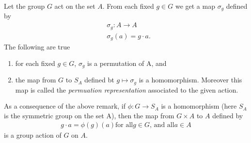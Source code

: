 \documentclass[../main]{subfiles}
\begin{document}
 
 \begin{rmk}
  Let the group $G$ act on the set $A$. From each fixed $g\in G$ we get a map $\sigma_g$ defined by 
  \begin{align*}
   &\sigma_g \colon A \to A \\
   &\sigma_g(a)=g\cdot a.
  \end{align*}
  The following are true
  \begin{enumerate}
   \item for each fixed $g\in G$, $\sigma_g$ is a permutation of A, and 
   \item the map from $G$ to $S_A$ defined bt $g\mapsto \sigma_g$ is a homomorphism. Moreover this map is called the \textit{permuation representation} associated to the given action. 
  \end{enumerate}
 \end{rmk}

 \begin{rmk}
  As a consequence of the above remark, if $\phi \colon G \to S_A$ is a homomorphism (here $S_A$ is the symmetric group on the set A), then the map from $G\times A$ to $ A$ defined by 
  \begin{align*}
   g\cdot a = \phi(g)(a) \text{for all} g\in G \text{, and all} a\in A
  \end{align*}
  is a group action of $G$ on $A$.
 \end{rmk}

 
\end{document}
